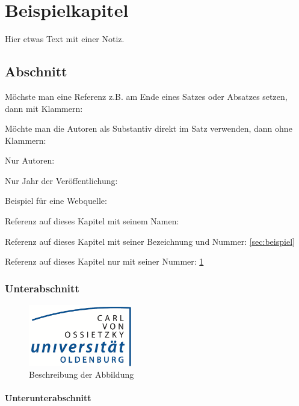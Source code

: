 \chapter{Beispielkapitel}\label{sec:beispiel}

Hier etwas Text mit einer Notiz.

\section{Abschnitt}\label{test:test2}

Möchste man eine Referenz z.B. am Ende eines Satzes oder Absatzes setzen, dann mit Klammern: \citep[S. 5]{hevner04:design}

Möchte man die Autoren als Substantiv direkt im Satz verwenden, dann ohne Klammern: \citet{hevner04:design}

Nur Autoren: \citeauthor{hevner04:design}

Nur Jahr der Veröffentlichung: \citeyear{hevner04:design}

Beispiel für eine Webquelle: \cite{internet00:webquelle}

Referenz auf dieses Kapitel mit seinem Namen: 

Referenz auf dieses Kapitel mit seiner Bezeichnung und Nummer: \autoref{sec:beispiel}

Referenz auf dieses Kapitel nur mit seiner Nummer: \ref{sec:beispiel}

\subsection{Unterabschnitt}

\begin{figure}[h!] %
\centering
\includegraphics[width=0.4\textwidth]{Abbildungen/uni_ol_logo.png}
\caption[Name der Abbildung im Tabellenverzeichnis]{Beschreibung der Abbildung}
\label{fig:figure}
\end{figure}

\subsubsection{Unterunterabschnitt}

